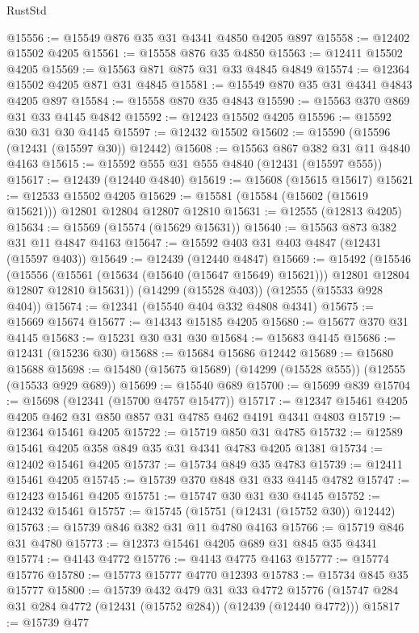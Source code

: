 \begin{lexlean}{RustStd}
\begin{coremodule}
@15556 := @15549 @876 @35 @31 @4341 @4850 @4205 @897
@15558 := @12402 @15502 @4205
@15561 := @15558 @876 @35 @4850
@15563 := @12411 @15502 @4205
@15569 := @15563 @871 @875 @31 @33 @4845 @4849
@15574 := @12364 @15502 @4205 @871 @31 @4845
@15581 := @15549 @870 @35 @31 @4341 @4843 @4205 @897
@15584 := @15558 @870 @35 @4843
@15590 := @15563 @370 @869 @31 @33 @4145 @4842
@15592 := @12423 @15502 @4205
@15596 := @15592 @30 @31 @30 @4145
@15597 := @12432 @15502
@15602 := @15590 (@15596 (@12431 (@15597 @30)) @12442)
@15608 := @15563 @867 @382 @31 @11 @4840 @4163
@15615 := @15592 @555 @31 @555 @4840 (@12431 (@15597 @555))
@15617 := @12439 (@12440 @4840)
@15619 := @15608 (@15615 @15617)
@15621 := @12533 @15502 @4205
@15629 := @15581 (@15584 (@15602 (@15619 @15621))) @12801 @12804 @12807 @12810
@15631 := @12555 (@12813 @4205)
@15634 := @15569 (@15574 (@15629 @15631))
@15640 := @15563 @873 @382 @31 @11 @4847 @4163
@15647 := @15592 @403 @31 @403 @4847 (@12431 (@15597 @403))
@15649 := @12439 (@12440 @4847)
@15669 := @15492
    (@15546
      (@15556 (@15561 (@15634 (@15640 (@15647 @15649) @15621))) @12801 @12804 @12807 @12810 @15631))
    (@14299 (@15528 @403))
    (@12555 (@15533 @928 @404))
@15674 := @12341 (@15540 @404 @332 @4808 @4341)
@15675 := @15669 @15674
@15677 := @14343 @15185 @4205
@15680 := @15677 @370 @31 @4145
@15683 := @15231 @30 @31 @30
@15684 := @15683 @4145
@15686 := @12431 (@15236 @30)
@15688 := @15684 @15686 @12442
@15689 := @15680 @15688
@15698 := @15480 (@15675 @15689) (@14299 (@15528 @555)) (@12555 (@15533 @929 @689))
@15699 := @15540 @689
@15700 := @15699 @839
@15704 := @15698 (@12341 (@15700 @4757 @15477))
@15717 := @12347 @15461 @4205 @4205 @462 @31 @850 @857 @31 @4785 @462 @4191 @4341 @4803
@15719 := @12364 @15461 @4205
@15722 := @15719 @850 @31 @4785
@15732 := @12589 @15461 @4205 @358 @849 @35 @31 @4341 @4783 @4205 @1381
@15734 := @12402 @15461 @4205
@15737 := @15734 @849 @35 @4783
@15739 := @12411 @15461 @4205
@15745 := @15739 @370 @848 @31 @33 @4145 @4782
@15747 := @12423 @15461 @4205
@15751 := @15747 @30 @31 @30 @4145
@15752 := @12432 @15461
@15757 := @15745 (@15751 (@12431 (@15752 @30)) @12442)
@15763 := @15739 @846 @382 @31 @11 @4780 @4163
@15766 := @15719 @846 @31 @4780
@15773 := @12373 @15461 @4205 @689 @31 @845 @35 @4341
@15774 := @4143 @4772
@15776 := @4143 @4775 @4163
@15777 := @15774 @15776
@15780 := @15773 @15777 @4770 @12393
@15783 := @15734 @845 @35 @15777
@15800 := @15739
    @432
    @479
    @31
    @33
    @4772
    @15776
    (@15747 @284 @31 @284 @4772 (@12431 (@15752 @284)) (@12439 (@12440 @4772)))
@15817 := @15739
    @477

\end{coremodule}
\end{lexlean}
